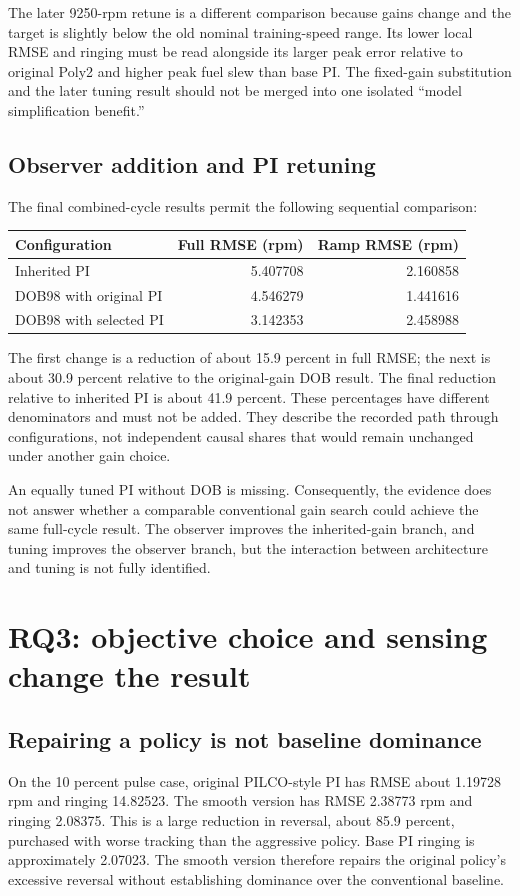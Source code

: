 The later 9250-rpm retune is a different comparison because gains change and the target is slightly below the old nominal training-speed range. Its lower local RMSE and ringing must be read alongside its larger peak error relative to original Poly2 and higher peak fuel slew than base PI. The fixed-gain substitution and the later tuning result should not be merged into one isolated ``model simplification benefit.''

\subsection{Observer addition and PI retuning}
The final combined-cycle results permit the following sequential comparison:
\begin{center}
\begin{tabular}{lrr}\toprule Configuration & Full RMSE (rpm) & Ramp RMSE (rpm)\\\midrule
Inherited PI & 5.407708 & 2.160858\\
DOB98 with original PI & 4.546279 & 1.441616\\
DOB98 with selected PI & 3.142353 & 2.458988\\\bottomrule
\end{tabular}
\end{center}
The first change is a reduction of about 15.9 percent in full RMSE; the next is about 30.9 percent relative to the original-gain DOB result. The final reduction relative to inherited PI is about 41.9 percent. These percentages have different denominators and must not be added. They describe the recorded path through configurations, not independent causal shares that would remain unchanged under another gain choice.

An equally tuned PI without DOB is missing. Consequently, the evidence does not answer whether a comparable conventional gain search could achieve the same full-cycle result. The observer improves the inherited-gain branch, and tuning improves the observer branch, but the interaction between architecture and tuning is not fully identified.

\section{RQ3: objective choice and sensing change the result}
\subsection{Repairing a policy is not baseline dominance}
On the 10 percent pulse case, original PILCO-style PI has RMSE about 1.19728 rpm and ringing 14.82523. The smooth version has RMSE 2.38773 rpm and ringing 2.08375. This is a large reduction in reversal, about 85.9 percent, purchased with worse tracking than the aggressive policy. Base PI ringing is approximately 2.07023. The smooth version therefore repairs the original policy's excessive reversal without establishing dominance over the conventional baseline.

